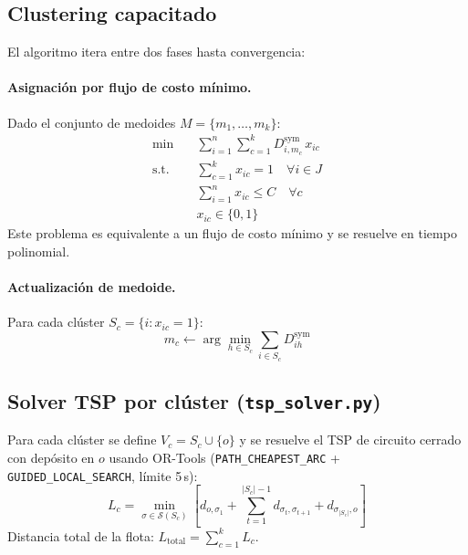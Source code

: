\documentclass[12pt,a4paper]{article}
\begin{document}
\subsection{Clustering capacitado}

El algoritmo itera entre dos fases hasta convergencia:

\paragraph{Asignaci\'on por flujo de costo m\'inimo.}
Dado el conjunto de medoides $M = \{m_1, \ldots, m_k\}$:
\begin{align}
  \min \quad & \sum_{i=1}^{n}\sum_{c=1}^{k} D^{\mathrm{sym}}_{i,m_c}\,x_{ic}
    \label{eq:km_obj}\\
  \text{s.t.}\quad
  & \sum_{c=1}^{k} x_{ic} = 1 \quad\forall i\in J \label{eq:km_assign}\\
  & \sum_{i=1}^{n} x_{ic} \leq C \quad\forall c \label{eq:km_cap}\\
  & x_{ic}\in\{0,1\} \label{eq:km_bin}
\end{align}
Este problema es equivalente a un flujo de costo m\'inimo y se resuelve en tiempo polinomial.

\paragraph{Actualizaci\'on de medoide.}
Para cada cl\'uster $S_c = \{i : x_{ic}=1\}$:
\begin{equation}
  m_c \leftarrow \arg\min_{h\in S_c}\sum_{i\in S_c} D^{\mathrm{sym}}_{ih}
\end{equation}

\subsection{Solver TSP por cl\'uster (\texttt{tsp\_solver.py})}

Para cada cl\'uster se define $V_c = S_c\cup\{o\}$ y se resuelve el TSP de
circuito cerrado con dep\'osito en $o$ usando OR-Tools
(\texttt{PATH\_CHEAPEST\_ARC} + \texttt{GUIDED\_LOCAL\_SEARCH}, l\'imite 5\,s):
\begin{equation}
  L_c = \min_{\sigma\in\mathcal{S}(S_c)}
        \left[ d_{o,\sigma_1}
             + \sum_{t=1}^{|S_c|-1} d_{\sigma_t,\sigma_{t+1}}
             + d_{\sigma_{|S_c|},o} \right]
\end{equation}
Distancia total de la flota: $L_{\mathrm{total}} = \sum_{c=1}^{k} L_c$.
\end{document}
